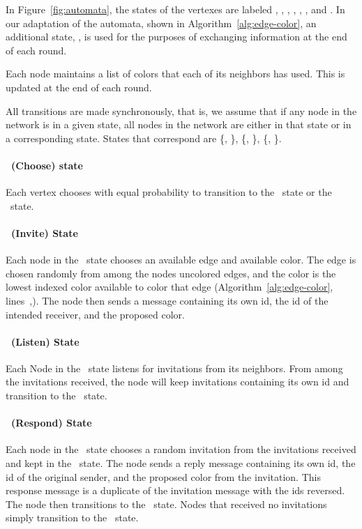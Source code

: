 \label{sec:dimaed-description}
In Figure~\ref{fig:automata}, the states of the vertexes are labeled \cCd, \cId, \cLd, \cWd, \cRd, \cUd, and \cDd. In our adaptation of the automata, shown in Algorithm~\ref{alg:edge-color}, an additional state, \cEd, is used for the purposes of exchanging information at the end of each round.

Each node maintains a list of colors that each of its neighbors has used. This is updated at the end of each round.

All transitions are made synchronously, that is, we assume that if any node in the network is in a given state, all nodes in the network are either in that state or in a corresponding state. States that correspond are \{\cCd, \cDd\}, \{\cId, \cLd\}, \{\cRd, \cWd\}.

\paragraph{\cCd\ (Choose) state}
Each vertex chooses with equal probability to transition to the \cId\ state or the \cLd\ state. 

\paragraph{\cId\ (Invite) State} 
Each node in the \cId\ state chooses an available edge and available color. The edge is chosen randomly from among the nodes uncolored edges, and the color is the lowest indexed color available to color that edge (Algorithm~\ref{alg:edge-color}, lines~,). The node then sends a message containing its own id, the id of the intended receiver, and the proposed color. 

\paragraph{\cLd\ (Listen) State} 
Each Node in the \cLd\ state listens for invitations from its neighbors. From among the invitations received, the node will keep invitations containing its own id and transition to the \cRd\ state.

\paragraph{\cRd\ (Respond) State}
Each node in the \cRd\ state chooses a random invitation from the invitations received and kept in the \cLd\ state. The node sends a reply message containing its own id, the id of the original sender, and the proposed color from the invitation. This response message is a duplicate of the invitation message with the ids reversed. The node then transitions to the \cUd\ state. Nodes that received no invitations simply transition to the \cUd\ state.


